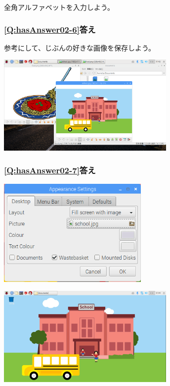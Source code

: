 \documentclass[a4paper,12pt]{jarticle}
\begin{document}
\bigskip

全角アルファベットを入力しよう。
\clearpage

\subsubsection{\bfseries
\ref*{Q:hasAnswer02-6}答え}

参考にして、じぶんの好きな画像を保存しよう。

\centering
\includegraphics[width=0.65\textwidth]{textbook-img221.png}
\flushleft

\bigskip


\subsubsection{\bfseries
\ref*{Q:hasAnswer02-7}答え}



\centering
\includegraphics[width=0.55\textwidth]{textbook-img222.png}


\centering
\includegraphics[width=0.65\textwidth]{textbook-img223.png}
\end{document}
